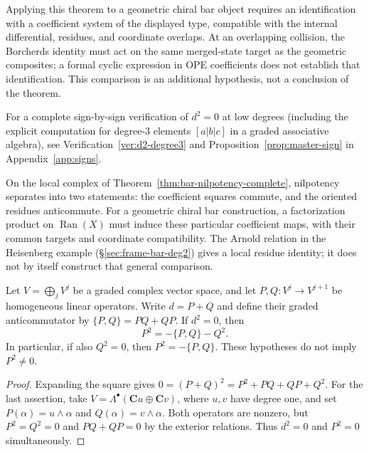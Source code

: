 Applying this theorem to a geometric chiral bar object requires an identification with a
coefficient system of the displayed type, compatible with the internal differential,
residues, and coordinate overlaps.
At an overlapping collision, the Borcherds identity must act on the same merged-state target
as the geometric composites; a formal cyclic expression in OPE coefficients does not establish
that identification.  This comparison is an additional hypothesis, not a conclusion of the theorem.


\begin{remark}\label{rem:sign-bridge}
For a complete sign-by-sign verification of $d^2 = 0$ at low degrees
(including the explicit computation for degree-3 elements $[a|b|c]$ in a
graded associative algebra), see Verification~\ref{ver:d2-degree3} and
Proposition~\ref{prop:master-sign} in Appendix~\ref{app:signs}.
\end{remark}

\begin{remark}\label{rem:d-squared-synthesis}\label{rem:geometric-miracle}
On the local complex of Theorem~\ref{thm:bar-nilpotency-complete},
nilpotency separates into two statements: the coefficient squares commute,
and the oriented residues anticommute.
For a geometric chiral bar construction, a factorization product on
$\operatorname{Ran}(X)$ must induce these particular coefficient maps,
with their common targets and coordinate compatibility.
The Arnold relation in the Heisenberg example
(\S\ref{sec:frame-bar-deg2}) gives a local residue identity; it does not
by itself construct that general comparison.
\end{remark}

\begin{proposition}\label{prop:pole-decomposition}
Let $V=\bigoplus_j V^j$ be a graded complex vector space, and let
$P,Q:V^j\to V^{j+1}$ be homogeneous linear operators.
Write $d=P+Q$ and define their graded anticommutator by
$\{P,Q\}=PQ+QP$.
If $d^2=0$, then
\[
P^2=-\{P,Q\}-Q^2.
\]
In particular, if also $Q^2=0$, then $P^2=-\{P,Q\}$.
These hypotheses do not imply $P^2\ne0$.
\end{proposition}

\begin{proof}
Expanding the square gives
$0=(P+Q)^2=P^2+PQ+QP+Q^2$.
For the last assertion, take $V=\Lambda^\bullet(\mathbf C u\oplus\mathbf C v)$,
where $u,v$ have degree one, and set $P(\alpha)=u\wedge\alpha$ and
$Q(\alpha)=v\wedge\alpha$.
Both operators are nonzero, but $P^2=Q^2=0$ and
$PQ+QP=0$ by the exterior relations.
Thus $d^2=0$ and $P^2=0$ simultaneously.
\end{proof}

